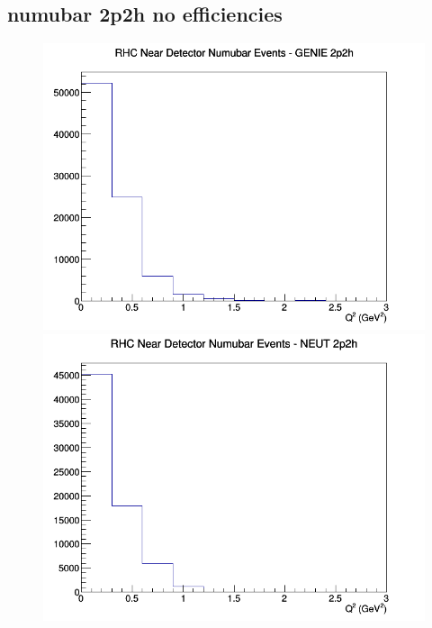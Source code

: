 \documentclass[12pt]{article}
\begin{document}
\subsection{numubar 2p2h no efficiencies}
\begin{figure}[h]
\includegraphics[width=\linewidth]{Q2/nominal/2p2h_RHC_ND_numubar_Q2_GENIE.png}
\endminipage
{}
\includegraphics[width=\linewidth]{Q2/nominal/2p2h_RHC_ND_numubar_Q2_NEUT.png}
\endminipage
{}

\end{figure}
\end{document}
